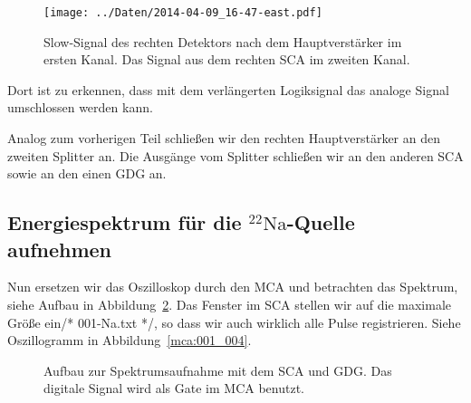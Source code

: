 \begin{figure}[htbp]
    \centering
    \texttt{[image: ../Daten/2014-04-09\_16-47-east.pdf]}
    \caption{%
        Slow-Signal des rechten Detektors nach dem Hauptverstärker im ersten
        Kanal. Das Signal aus dem rechten SCA im zweiten Kanal.
    }
    \label{fig:sca_umschlossen}
\end{figure}

Dort ist zu erkennen, dass mit dem verlängerten Logiksignal das analoge Signal
umschlossen werden kann.

Analog zum vorherigen Teil schließen wir den rechten Hauptverstärker an den
zweiten Splitter an. Die Ausgänge vom Splitter schließen wir an den anderen SCA
sowie an den einen GDG an.

\subsection{Energiespektrum für die ${}^{22}\mathrm{Na}$-Quelle aufnehmen}

Nun ersetzen wir das Oszilloskop durch den MCA und betrachten das Spektrum,
siehe Aufbau in Abbildung~\ref{fig:aufbau:sca_gdg_mca}. Das Fenster im SCA
stellen wir auf die maximale Größe ein/* 001-Na.txt */, so dass wir auch
wirklich alle Pulse registrieren. Siehe Oszillogramm in
Abbildung~\ref{mca:001_004}.

\begin{figure}[htbp]
    \centering
    \caption{%
        Aufbau zur Spektrumsaufnahme mit dem SCA und GDG. Das digitale Signal
        wird als Gate im MCA benutzt.
    }
    \label{fig:aufbau:sca_gdg_mca}
\end{figure}

